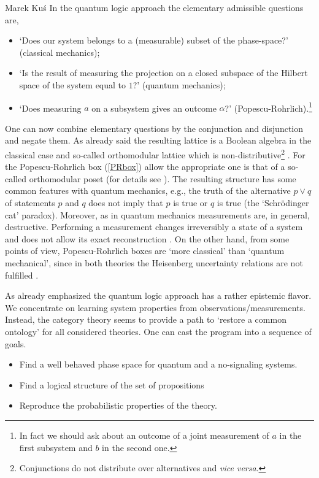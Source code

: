 \begin{artengenv}{Marek Ku\'s}
In the quantum logic approach the elementary admissible questions are,
\begin{itemize}
	\item `Does our system belongs to a (measurable) subset of the phase-space?' (classical mechanics);
	\item `Is the result of measuring the projection on a closed subspace of the Hilbert space of the system equal to $1$?' (quantum mechanics);
	\item `Does measuring $a$ on a subsystem gives an outcome $\alpha$?' (Popescu-Rohrlich).\footnote{In fact we should ask about an outcome of a joint measurement of $a$ in the first subsystem and $b$ in the second one.}
\end{itemize}
One can now combine elementary questions by the conjunction and disjunction and negate them. As already said the resulting lattice is a Boolean algebra in the classical case and so-called orthomodular lattice which is non-distributive\footnote{Conjunctions do not distribute over alternatives and \textit{vice versa}.} \parencite{birkhoff_logic_1936}. For the Popescu-Rohrlich box (\ref{PRbox}) allow the appropriate one is that of a so-called orthomodular poset (for details see \parencite{tylec_non-signaling_2015,tylec_ignorance_2018}). The resulting structure has some common features with quantum mechanics, e.g., the truth of the alternative $p\vee q$ of statements $p$ and $q$ does not imply that $p$ is true or $q$ is true (the `Schr\"odinger cat' paradox). Moreover, as in quantum mechanics measurements are, in general, destructive. Performing a measurement changes irreversibly a state of a system and does not allow its exact reconstruction \parencite{tylec_non-signaling_2015}. On the other hand, from some points of view, Popescu-Rohrlich boxes are `more classical' than `quantum mechanical', since  in both theories the Heisenberg uncertainty relations are not fulfilled \parencite{tylec_non-signaling_2015}.   
 
As already emphasized the quantum logic approach has a rather epistemic flavor. We concentrate on learning system properties from observations/measurements. Instead, the category theory seems to provide a path to `restore a common ontology' for all considered theories. One can cast the program into a sequence of goals.

\begin{itemize}
	\item Find a well behaved phase space for quantum and a no-signaling systems. 
	\item Find a logical structure of the set of propositions 
	\item Reproduce the probabilistic properties of the theory.
\end{itemize} 


\end{artengenv}
